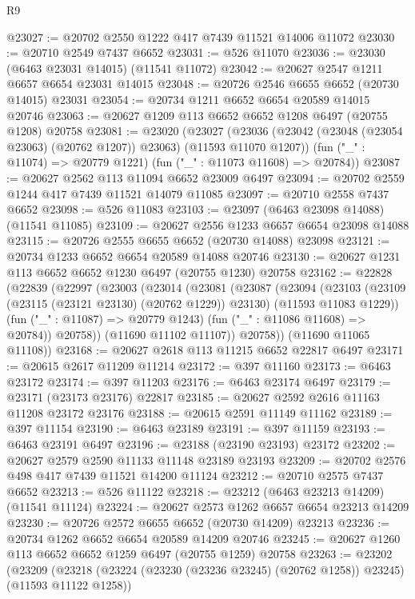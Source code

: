 \begin{lexlean}{R9}
\begin{coremodule}
@23027 := @20702 @2550 @1222 @417 @7439 @11521 @14006 @11072
@23030 := @20710 @2549 @7437 @6652
@23031 := @526 @11070
@23036 := @23030 (@6463 @23031 @14015) (@11541 @11072)
@23042 := @20627 @2547 @1211 @6657 @6654 @23031 @14015
@23048 := @20726 @2546 @6655 @6652 (@20730 @14015) @23031
@23054 := @20734 @1211 @6652 @6654 @20589 @14015 @20746
@23063 := @20627 @1209 @113 @6652 @6652 @1208 @6497 (@20755 @1208) @20758
@23081 := @23020
    (@23027
      (@23036 (@23042 (@23048 (@23054 @23063) (@20762 @1207)) @23063) (@11593 @11070 @1207))
      (fun ("_" : @11074) => @20779 @1221)
      (fun ("_" : @11073 @11608) => @20784))
@23087 := @20627 @2562 @113 @11094 @6652 @23009 @6497
@23094 := @20702 @2559 @1244 @417 @7439 @11521 @14079 @11085
@23097 := @20710 @2558 @7437 @6652
@23098 := @526 @11083
@23103 := @23097 (@6463 @23098 @14088) (@11541 @11085)
@23109 := @20627 @2556 @1233 @6657 @6654 @23098 @14088
@23115 := @20726 @2555 @6655 @6652 (@20730 @14088) @23098
@23121 := @20734 @1233 @6652 @6654 @20589 @14088 @20746
@23130 := @20627 @1231 @113 @6652 @6652 @1230 @6497 (@20755 @1230) @20758
@23162 := @22828
    (@22839
      (@22997
        (@23003
          (@23014
            (@23081
              (@23087
                (@23094
                  (@23103
                    (@23109 (@23115 (@23121 @23130) (@20762 @1229)) @23130)
                    (@11593 @11083 @1229))
                  (fun ("_" : @11087) => @20779 @1243)
                  (fun ("_" : @11086 @11608) => @20784))
                @20758))
            (@11690 @11102 @11107))
          @20758))
      (@11690 @11065 @11108))
@23168 := @20627 @2618 @113 @11215 @6652 @22817 @6497
@23171 := @20615 @2617 @11209 @11214
@23172 := @397 @11160
@23173 := @6463 @23172
@23174 := @397 @11203
@23176 := @6463 @23174 @6497
@23179 := @23171 (@23173 @23176) @22817
@23185 := @20627 @2592 @2616 @11163 @11208 @23172 @23176
@23188 := @20615 @2591 @11149 @11162
@23189 := @397 @11154
@23190 := @6463 @23189
@23191 := @397 @11159
@23193 := @6463 @23191 @6497
@23196 := @23188 (@23190 @23193) @23172
@23202 := @20627 @2579 @2590 @11133 @11148 @23189 @23193
@23209 := @20702 @2576 @498 @417 @7439 @11521 @14200 @11124
@23212 := @20710 @2575 @7437 @6652
@23213 := @526 @11122
@23218 := @23212 (@6463 @23213 @14209) (@11541 @11124)
@23224 := @20627 @2573 @1262 @6657 @6654 @23213 @14209
@23230 := @20726 @2572 @6655 @6652 (@20730 @14209) @23213
@23236 := @20734 @1262 @6652 @6654 @20589 @14209 @20746
@23245 := @20627 @1260 @113 @6652 @6652 @1259 @6497 (@20755 @1259) @20758
@23263 := @23202
    (@23209
      (@23218 (@23224 (@23230 (@23236 @23245) (@20762 @1258)) @23245) (@11593 @11122 @1258))

\end{coremodule}
\end{lexlean}
